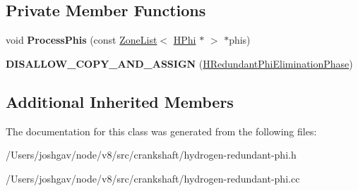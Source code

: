 \subsection*{Private Member Functions}
\begin{DoxyCompactItemize}
\item 
void {\bfseries Process\+Phis} (const \hyperlink{classv8_1_1internal_1_1_zone_list}{Zone\+List}$<$ \hyperlink{classv8_1_1internal_1_1_h_phi}{H\+Phi} $\ast$ $>$ $\ast$phis)\hypertarget{classv8_1_1internal_1_1_h_redundant_phi_elimination_phase_a325774161e668bcf22f530550f55f5a7}{}\label{classv8_1_1internal_1_1_h_redundant_phi_elimination_phase_a325774161e668bcf22f530550f55f5a7}

\item 
{\bfseries D\+I\+S\+A\+L\+L\+O\+W\+\_\+\+C\+O\+P\+Y\+\_\+\+A\+N\+D\+\_\+\+A\+S\+S\+I\+GN} (\hyperlink{classv8_1_1internal_1_1_h_redundant_phi_elimination_phase}{H\+Redundant\+Phi\+Elimination\+Phase})\hypertarget{classv8_1_1internal_1_1_h_redundant_phi_elimination_phase_a55db0de55632f0fd7b84bd80abc9e5a3}{}\label{classv8_1_1internal_1_1_h_redundant_phi_elimination_phase_a55db0de55632f0fd7b84bd80abc9e5a3}

\end{DoxyCompactItemize}
\subsection*{Additional Inherited Members}


The documentation for this class was generated from the following files\+:\begin{DoxyCompactItemize}
\item 
/\+Users/joshgav/node/v8/src/crankshaft/hydrogen-\/redundant-\/phi.\+h\item 
/\+Users/joshgav/node/v8/src/crankshaft/hydrogen-\/redundant-\/phi.\+cc\end{DoxyCompactItemize}
